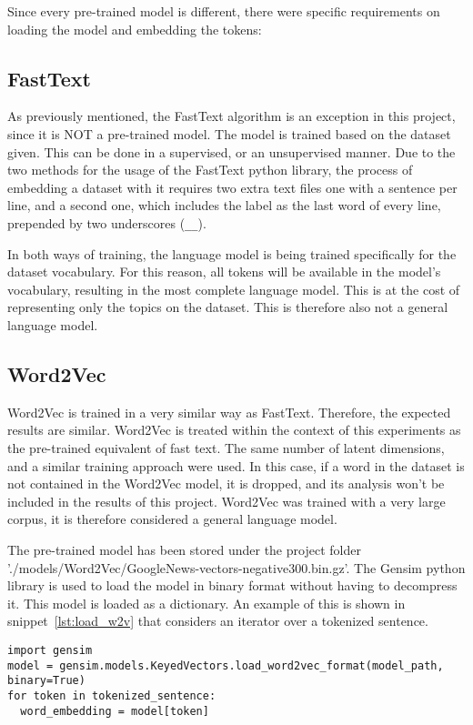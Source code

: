 Since every pre-trained model is different, there were specific requirements on loading the model and embedding the tokens:

\subsection{FastText}\label{sub:FastText}
As previously mentioned, the FastText algorithm is an exception in this project, since it is NOT a pre-trained model. The model is trained based on the dataset given. This can be done in a supervised, or an unsupervised manner. Due to the two methods for the usage of the FastText python library, the process of embedding a dataset with it requires two extra text files one with a sentence per line, and a second one, which includes the label as the last word of every line, prepended by two underscores (\lstinline{__}).

In both ways of training, the language model is being trained specifically for the dataset vocabulary. For this reason, all tokens will be available in the model's vocabulary, resulting in the most complete language model. This is at the cost of representing only the topics on the dataset. This is therefore also not a general language model.

\subsection{Word2Vec}\label{sub:Word2Vec}
Word2Vec is trained in a very similar way as FastText. Therefore, the expected results are similar. Word2Vec is treated within the context of this experiments as the pre-trained equivalent of fast text. The same number of latent dimensions, and a similar training approach were used. In this case, if a word in the dataset is not contained in the Word2Vec model, it is dropped, and its analysis won't be included in the results of this project. Word2Vec was trained with a very large corpus, it is therefore considered a general language model.

The pre-trained model has been stored under the project folder \\ './models/Word2Vec/GoogleNews-vectors-negative300.bin.gz'. The Gensim python library is used to load the model in binary format without having to decompress it. This model is loaded as a dictionary. An example of this is shown in snippet~\ref{lst:load_w2v} that considers an iterator over a tokenized sentence.

\begin{lstlisting}[caption={Loading Word2Vec},label=lst:load_w2v,frame=single]
import gensim
model = gensim.models.KeyedVectors.load_word2vec_format(model_path, binary=True)
for token in tokenized_sentence:
  word_embedding = model[token]
\end{lstlisting}

